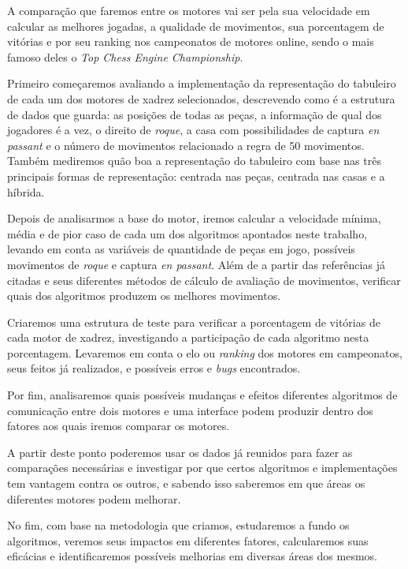 A comparação que faremos entre os motores vai ser pela sua velocidade em calcular as melhores jogadas, a qualidade de movimentos,
sua porcentagem de vitórias e por seu ranking nos campeonatos de motores online, sendo o mais famoso deles o \textit{Top Chess Engine Championship}.

Primeiro começaremos avaliando a implementação da representação do tabuleiro de cada um dos motores de xadrez selecionados,
descrevendo como é a estrutura de dados que guarda: as posições de todas as peças, a informação de qual dos jogadores
é a vez, o direito de \textit{roque}, a casa com possibilidades de captura \textit{en passant} e o número de movimentos relacionado
a regra de 50 movimentos. Também mediremos quão boa a representação do tabuleiro com base nas três principais
formas de representação: centrada nas peças, centrada nas casas e a híbrida.


Depois de analisarmos a base do motor, iremos calcular a velocidade mínima, média e de pior caso de cada um dos algoritmos
apontados neste trabalho, levando em conta as variáveis de quantidade de peças em jogo, possíveis movimentos de \textit{roque}
e captura \textit{en passant}. Além de a partir das referências já citadas e seus diferentes métodos de cálculo de avaliação
de movimentos, verificar quais dos algoritmos produzem os melhores movimentos.

Criaremos uma estrutura de teste para verificar a porcentagem de vitórias de cada motor de xadrez, investigando
a participação de cada algoritmo nesta porcentagem. Levaremos em conta o elo ou \textit{ranking} dos motores em campeonatos,
seus feitos já realizados, e possíveis erros e \textit{bugs} encontrados.

Por fim, analisaremos quais possíveis mudanças e efeitos diferentes algoritmos de comunicação entre dois motores
e uma interface podem produzir dentro dos fatores aos quais iremos comparar os motores.

A partir deste ponto poderemos usar os dados já reunidos para fazer as comparações necessárias e
investigar por que certos algoritmos e implementações tem vantagem contra os outros, e sabendo isso
saberemos em que áreas os diferentes motores podem melhorar.

No fim, com base na metodologia que criamos, estudaremos a fundo os algoritmos, veremos seus impactos
em diferentes fatores, calcularemos suas eficácias e identificaremos possíveis melhorias em diversas áreas dos mesmos.
